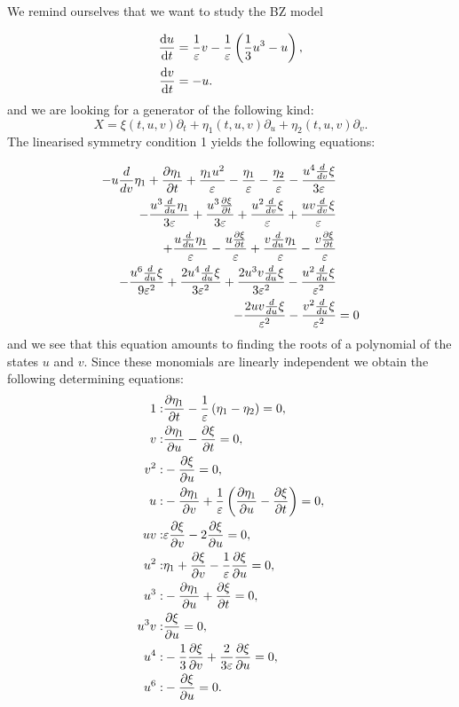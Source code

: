 We remind ourselves that we want to study the BZ model

\begin{equation}
  \begin{split}
    \dv{u}{t}&=\dfrac{1}{\varepsilon}v-\dfrac{1}{\varepsilon}\left(\dfrac{1}{3}u^3-u\right),\\
    \dv{v}{t}&=-u.\\    
    \end{split}
  \label{eq:BZ}
\end{equation}
and we are looking for a generator of the following kind:
\begin{equation}
X=\xi(t,u,v)\partial_t+\eta_1(t,u,v)\partial_u+\eta_2(t,u,v)\partial_v.
\end{equation}
The linearised symmetry condition 1 yields the following equations:


\begin{align}
  - u \frac{d}{d v} \eta_1 + \pdv{\eta_1}{t} + \frac{\eta_1 u^{2}}{\varepsilon} - \frac{\eta_1}{\varepsilon} - \frac{\eta_2}{\varepsilon} - \frac{u^{4} \frac{d}{d v} \xi}{3 \varepsilon}&\nonumber\\
  - \frac{u^{3} \frac{d}{d u} \eta_1}{3 \varepsilon} + \frac{u^{3} \pdv{\xi}{t}}{3 \varepsilon} + \frac{u^{2} \frac{d}{d v} \xi}{\varepsilon} + \frac{u v \frac{d}{d v} \xi}{\varepsilon}&\nonumber\\
  + \frac{u \frac{d}{d u} \eta_1}{\varepsilon} - \frac{u \pdv{\xi}{t}}{\varepsilon} + \frac{v \frac{d}{d u} \eta_1}{\varepsilon} - \frac{v\pdv{\xi}{t}}{\varepsilon}&\nonumber\\
  - \frac{u^{6} \frac{d}{d u} \xi}{9 \varepsilon^{2}} + \frac{2 u^{4} \frac{d}{d u} \xi}{3 \varepsilon^{2}} + \frac{2 u^{3} v \frac{d}{d u} \xi}{3 \varepsilon^{2}} - \frac{u^{2} \frac{d}{d u} \xi}{\varepsilon^{2}}&\nonumber\\
  - \frac{2 u v \frac{d}{d u} \xi}{\varepsilon^{2}} - \frac{v^{2} \frac{d}{d u} \xi}{\varepsilon^{2}}&=0\label{eq:BZ_lin_sym_1}
\end{align}
and we see that this equation amounts to finding the roots of a polynomial of the states $u$ and $v$. Since these monomials are linearly independent we obtain the following determining equations:
\begin{align}
  1:&\pdv{\eta_1}{t} - \frac{1}{\varepsilon}\left(\eta_1 - \eta_2\right)=0,\\
  v:&\pdv{\eta_1}{u} - \pdv{\xi}{t}=0,\\
  v^{2}:&- \pdv{\xi}{u}=0,\\
  u:&-\pdv{\eta_1}{v} + \frac{1}{\varepsilon}\left(\pdv{\eta_1}{u}  - \pdv{\xi}{t}\right)=0,\\  
  u v:&\varepsilon\pdv{\xi}{v} - 2 \pdv{\xi}{u}=0,\\
  u^{2}:&\eta_1 + \pdv{\xi}{v} - \frac{1}{\varepsilon} \pdv{\xi}{u}=0,\\
  u^{3}:&- \pdv{\eta_1}{u} + \pdv{\xi}{t}=0,\\
u^{3} v:&\pdv{\xi}{u}=0,\\
 u^{4}:&- \frac{1}{3}\pdv{\xi}{v} + \frac{2}{3 \varepsilon}\pdv{\xi}{u}=0,\\
 u^{6}:&- \pdv{\xi}{u}=0.\\
\end{align}

